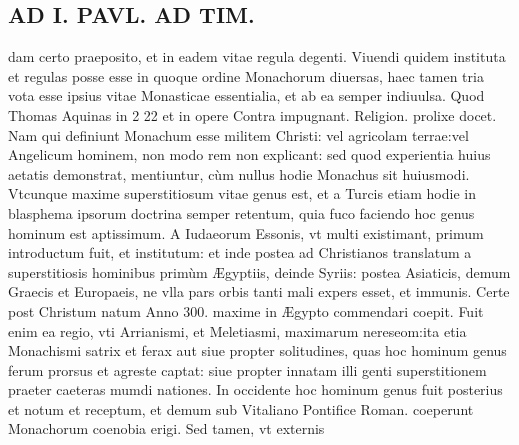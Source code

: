 \documentclass{article}
\begin{document}
\begin{pages}
\section*{AD I. PAVL. AD TIM. }
\marginpar{[ p.214 ]}\pstart dam certo praeposito, et in eadem vitae regula degenti.  \pend\pstart Viuendi quidem instituta et regulas posse esse in quoque  ordine Monachorum diuersas, haec tamen tria vota esse ipsius vitae Monasticae essentialia, et ab ea semper indiuulsa. Quod Thomas Aquinas in 2 22 et in opere Contra impugnant. Religion. prolixe docet. Nam qui definiunt Monachum esse militem Christi: vel agricolam terrae:vel Angelicum hominem, non modo rem non explicant: sed quod experientia huius aetatis demonstrat, mentiuntur, cùm nullus hodie Monachus sit huiusmodi. Vtcunque maxime superstitiosum vitae genus est, et a Turcis etiam hodie in blasphema ipsorum doctrina semper retentum, quia fuco faciendo hoc genus hominum est aptissimum. A Iudaeorum Essonis, vt multi existimant, primum introductum fuit, et institutum: et inde postea ad Christianos translatum a superstitiosis hominibus primùm Ægyptiis, deinde Syriis: postea Asiaticis, demum Graecis et Europaeis, ne vlla pars orbis tanti mali expers esset, et immunis. Certe post Christum natum Anno 300. maxime in Ægypto commendari coepit. Fuit enim ea regio, vti Arrianismi, et Meletiasmi, maximarum nereseom:ita etia Monachismi satrix et ferax aut siue propter solitudines, quas hoc hominum genus ferum prorsus et agreste captat: siue propter innatam illi genti superstitionem praeter caeteras mumdi nationes. In occidente hoc hominum genus fuit posterius et notum et receptum, et demum sub Vitaliano Pontifice Roman. coeperunt Monachorum coenobia erigi. Sed tamen, vt externis  \pend

\end{pages}
\end{document}
